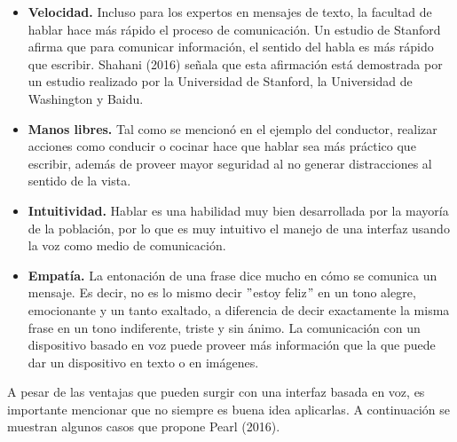 \begin{itemize}
  \item \textbf{Velocidad.} Incluso para los expertos en mensajes de texto, la facultad de hablar hace más rápido el proceso de comunicación. Un estudio de Stanford afirma que para comunicar información, el sentido del habla es más rápido que escribir. Shahani (2016) señala que esta afirmación está demostrada por un estudio realizado por  la Universidad de Stanford, la Universidad de Washington y Baidu.
  \item \textbf{Manos libres.} Tal como se mencionó en el ejemplo del conductor, realizar acciones como conducir o cocinar hace que hablar sea más práctico que escribir, además de proveer mayor seguridad al no generar distracciones al sentido de la vista.
  \item \textbf{Intuitividad.} Hablar es una habilidad muy bien desarrollada por la mayoría de la población, por lo que es muy intuitivo el manejo de una interfaz usando la voz como medio de comunicación.
  \item \textbf{Empatía.} La entonación de una frase dice mucho en cómo se comunica un mensaje. Es decir, no es lo mismo decir $"$estoy feliz$"$ en un tono alegre, emocionante y un tanto exaltado, a diferencia de decir exactamente la misma frase en un tono indiferente, triste y sin ánimo. La comunicación con un dispositivo basado en voz puede proveer más información que la que puede dar un dispositivo en texto o en imágenes.
\end{itemize}

A pesar de las ventajas que pueden surgir con una interfaz basada en voz, es importante mencionar que no siempre es buena idea aplicarlas. A continuación se muestran algunos casos que propone Pearl (2016).

